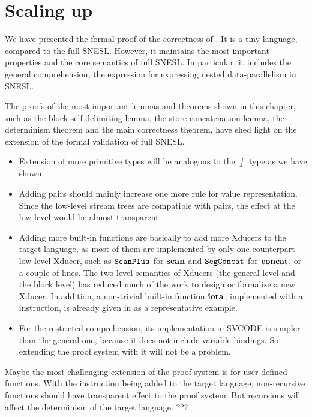 \section{Scaling up}

We have presented the formal proof of the correctness of \fmsnesl. 
It is a tiny language, compared to the full SNESL. 
However, it maintains the most important properties and the core semantics of full SNESL.
In particular, it includes the general comprehension, the expression for expressing nested data-parallelism in SNESL. 
 
The proofs of the most important lemmas and theorems shown in this chapter, such as the block self-delimiting lemma, the store concatenation lemma, the determinism theorem and the main correctness theorem, have shed light on the extension of  the formal validation of full SNESL. 


\begin{itemize}
	\item Extension of more primitive types will be analogous to the $\int$ type as we have shown.
	
	\item Adding pairs should mainly increase one more rule for value representation. Since the low-level stream trees are compatible with pairs, the effect at the low-level would be almost transparent. 
	
	\item Adding more built-in functions are basically to add more Xducers to the target language, as most of them are implemented by only one counterpart low-level Xducer, such as $\mathtt{ScanPlus}_{}$ for $\mathbf{scan}$ and $\mathtt{SegConcat}$ for $\mathbf{concat}$, or a couple of lines.
	The two-level semantics of Xducers (the general level and the block level) has reduced much of the work to design or formalize a new Xducer.
	In addition, a non-trivial built-in function $\mathbf{iota}$, implemented with a \wc instruction, is already given in \fmsnesl as a representative example.
 
	
	\item For the restricted comprehension, its implementation in SVCODE is simpler than the general one, because it does not include variable-bindings. So extending the proof system with it will not be a problem. 
	
\end{itemize}

Maybe the most challenging extension of the proof system is for user-defined functions. 
With the \sc instruction being added to the target language, non-recursive functions should have transparent effect to the proof system. 
But recursions will affect the determinism of the target language.  ???




